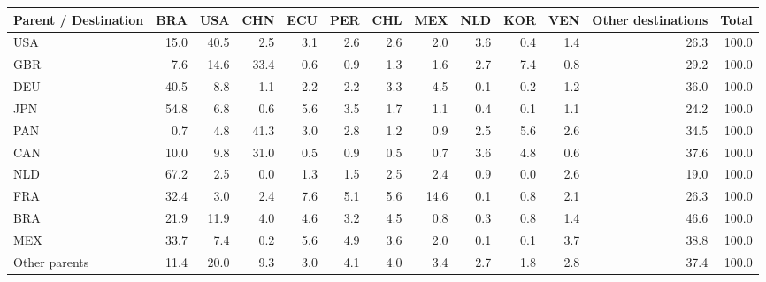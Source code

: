 \begin{tabular}{lrrrrrrrrrrrr}
\toprule
Parent / Destination & BRA & USA & CHN & ECU & PER & CHL & MEX & NLD & KOR & VEN & Other destinations & Total \\
\midrule
USA & 15.0 & 40.5 & 2.5 & 3.1 & 2.6 & 2.6 & 2.0 & 3.6 & 0.4 & 1.4 & 26.3 & 100.0 \\
GBR & 7.6 & 14.6 & 33.4 & 0.6 & 0.9 & 1.3 & 1.6 & 2.7 & 7.4 & 0.8 & 29.2 & 100.0 \\
DEU & 40.5 & 8.8 & 1.1 & 2.2 & 2.2 & 3.3 & 4.5 & 0.1 & 0.2 & 1.2 & 36.0 & 100.0 \\
JPN & 54.8 & 6.8 & 0.6 & 5.6 & 3.5 & 1.7 & 1.1 & 0.4 & 0.1 & 1.1 & 24.2 & 100.0 \\
PAN & 0.7 & 4.8 & 41.3 & 3.0 & 2.8 & 1.2 & 0.9 & 2.5 & 5.6 & 2.6 & 34.5 & 100.0 \\
CAN & 10.0 & 9.8 & 31.0 & 0.5 & 0.9 & 0.5 & 0.7 & 3.6 & 4.8 & 0.6 & 37.6 & 100.0 \\
NLD & 67.2 & 2.5 & 0.0 & 1.3 & 1.5 & 2.5 & 2.4 & 0.9 & 0.0 & 2.6 & 19.0 & 100.0 \\
FRA & 32.4 & 3.0 & 2.4 & 7.6 & 5.1 & 5.6 & 14.6 & 0.1 & 0.8 & 2.1 & 26.3 & 100.0 \\
BRA & 21.9 & 11.9 & 4.0 & 4.6 & 3.2 & 4.5 & 0.8 & 0.3 & 0.8 & 1.4 & 46.6 & 100.0 \\
MEX & 33.7 & 7.4 & 0.2 & 5.6 & 4.9 & 3.6 & 2.0 & 0.1 & 0.1 & 3.7 & 38.8 & 100.0 \\
Other parents & 11.4 & 20.0 & 9.3 & 3.0 & 4.1 & 4.0 & 3.4 & 2.7 & 1.8 & 2.8 & 37.4 & 100.0 \\
\bottomrule
\end{tabular}
